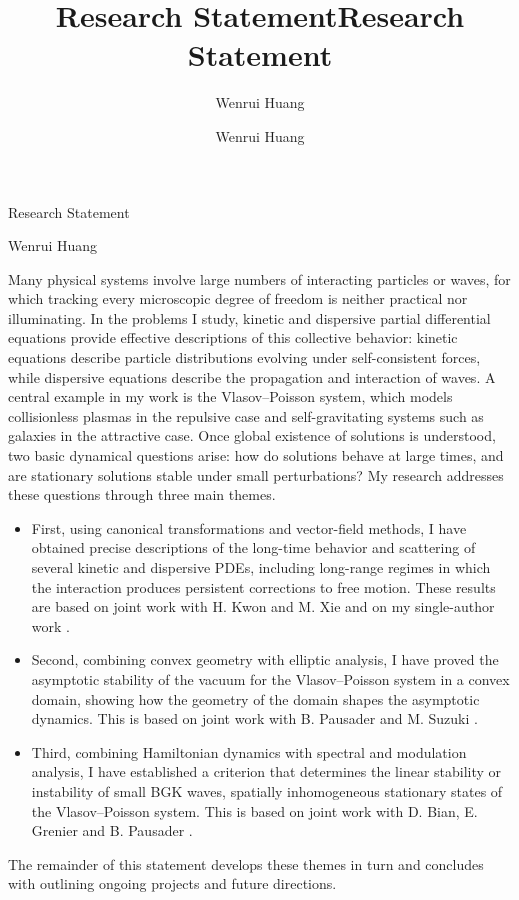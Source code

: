 \documentclass[10pt,reqno]{amsart}
\title{Research Statement}
\author{Wenrui Huang}
\title{Research Statement}
\author{Wenrui Huang}
\theoremstyle{definition}
\begin{document}
\begin{center}
{\LARGE Research Statement}\bigskip 

{\large Wenrui Huang}
\end{center}
\vskip 22pt
 
Many physical systems involve large numbers of interacting particles or waves, for which tracking every microscopic degree of freedom is neither practical nor illuminating. In the problems I study, kinetic and dispersive partial differential equations provide effective descriptions of this collective behavior: kinetic equations describe particle distributions evolving under self-consistent forces, while dispersive equations describe the propagation and interaction of waves. A central example in my work is the Vlasov--Poisson system, which models collisionless plasmas in the repulsive case and self-gravitating systems such as galaxies in the attractive case. Once global existence of solutions is understood, two basic dynamical questions arise: how do solutions behave at large times, and are stationary solutions stable under small perturbations? My research addresses these questions through three main themes.

\begin{itemize}
   \item 
First, using canonical transformations and vector-field methods, I have obtained precise descriptions of the long-time behavior and scattering of several kinetic and dispersive PDEs, including long-range regimes in which the interaction produces persistent corrections to free motion. These results are  based on  joint work with H. Kwon and M. Xie \cite{HK24,HK26,HX26a,HX26b}  and on  my single-author work \cite{H24a,H26}.
    \item Second, combining convex geometry with elliptic analysis, I have proved the asymptotic stability of the vacuum for the Vlasov--Poisson system in a convex domain, showing how the geometry of the domain shapes the asymptotic dynamics. This is based on  joint work with B. Pausader and M. Suzuki \cite{HPS24}.
    \item Third, combining Hamiltonian dynamics with spectral and modulation analysis, I have established a criterion that determines the linear stability or instability of small BGK waves, spatially inhomogeneous stationary states of the Vlasov--Poisson system. This is based on  joint work with D. Bian, E. Grenier and B. Pausader \cite{BGHP26}.
 
\end{itemize}
The remainder of this statement develops these themes in turn and concludes with outlining ongoing projects and future directions.
\end{document}
